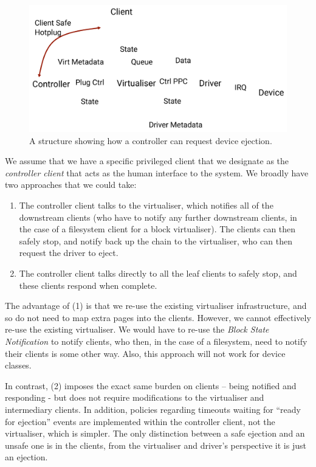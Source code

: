 \documentclass[a4paper,12pt]{report}
\newcommand{\figscale}{0.2}
\begin{document}
\begin{figure}[th]
  \centering
  \includegraphics[scale=\figscale]{hotplug_safe_eject}
  \caption{A structure showing how a controller can request device ejection.}
  \label{f:hotplug_safe_eject}
\end{figure}

We assume that we have a specific privileged client that we designate as
the \emph{controller client} that acts as the human interface to the system.
We broadly have two approaches that we could take:

\begin{enumerate}
\item The controller client talks to the virtualiser, which notifies all of
      the downstream clients (who have to notify any further downstream
      clients, in the case of a filesystem client for a block virtualiser).
      The clients can then safely stop, and notify back up the chain to the
      virtualiser, who can then request the driver to eject.

\item The controller client talks directly to all the leaf clients to safely
      stop, and these clients respond when complete.
\end{enumerate}

The advantage of (1) is that we re-use the existing virtualiser
infrastructure, and so do not need to map extra pages into the clients.
However, we cannot effectively re-use the existing virtualiser. We would
have to re-use the \emph{Block State Notification} to notify clients,
who then, in the case of a filesystem, need to notify their clients is
some other way. Also, this approach will not work for  device classes.

In contrast, (2) imposes the exact same burden on clients -- being
notified and responding - but does not require modifications to the
virtualiser and intermediary clients. In addition, policies regarding
timeouts waiting for ``ready for ejection'' events are implemented within the
controller client, not the virtualiser, which is simpler. The only
distinction between a safe ejection and an unsafe one is in the
clients, from the virtualiser and driver's perspective it is just an
ejection.
\end{document}
